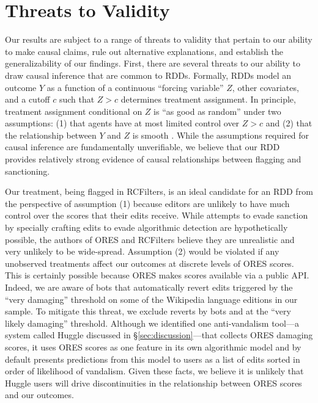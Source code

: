 \documentclass[format=acmsmall, natbib=true,  screen=true]{acmart}
\begin{document}
\section{Threats to Validity}

Our results are subject to a range of threats to validity that pertain to our ability to make causal claims, rule out alternative explanations, and establish the generalizability of our findings. First, there are several threats to our ability to draw causal inference that are common to RDDs.
Formally, RDDs model an outcome $Y$ as a function of a continuous ``forcing variable'' $Z$, other covariates, and a cutoff $c$ such that $Z>c$ determines treatment assignment.  In principle, treatment assignment conditional on $Z$ is ``as good as random'' under two assumptions: (1) that agents have at most limited control over $Z>c$ and (2) that the relationship between $Y$ and $Z$ is smooth \cite{lee_regression_2010}.
While the assumptions required for causal inference are fundamentally unverifiable, we believe that our RDD provides relatively strong evidence of causal relationships between flagging and sanctioning.

Our treatment, being flagged in RCFilters, is an ideal candidate for an RDD from the perspective of assumption (1) because editors are unlikely to have much control over the scores that their edits receive.  While attempts to evade sanction by specially crafting edits to evade algorithmic detection are hypothetically possible, the authors of ORES and RCFilters believe they are unrealistic and very unlikely to be wide-spread.
Assumption (2) would be violated if any unobserved treatments affect our outcomes at discrete levels of ORES scores. This is certainly possible because ORES makes scores available via a public API. Indeed, we are aware of bots that automatically revert edits triggered by the ``very damaging'' threshold on some of the Wikipedia language editions in our sample. To mitigate this threat, we exclude reverts by bots and at the ``very likely damaging'' threshold.  
Although we identified one anti-vandalism tool---a system called Huggle discussed in §\ref{sec:discussion}---that collects ORES damaging scores, it uses ORES scores as one feature in its own algorithmic model and by default presents predictions from this model to users as a list of edits sorted in order of likelihood of vandalism. Given these facts, we believe it is unlikely that Huggle users will drive discontinuities in the relationship between ORES scores and our outcomes. 
\end{document}
